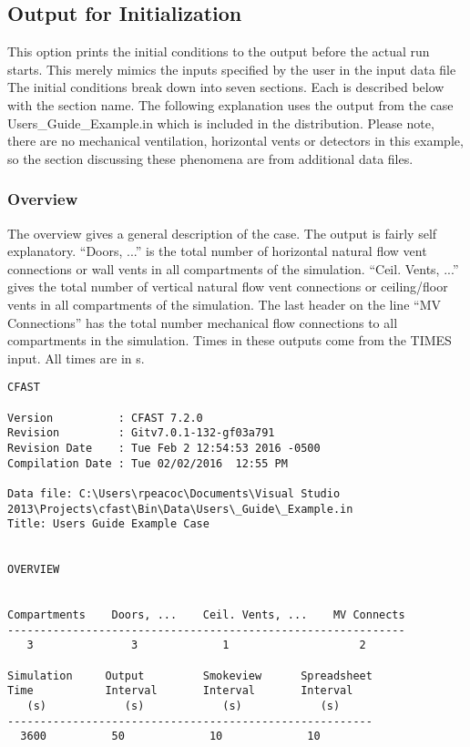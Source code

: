 \subsection{Output for Initialization}

This option prints the initial conditions to the output before the actual run starts.  This merely mimics the inputs specified by the user in the input data file  The initial conditions break down into seven sections.  Each is described below with the section name. The following explanation uses the output from the case Users\_Guide\_Example.in which is included in the distribution. Please note, there are no mechanical ventilation, horizontal vents or detectors in this example, so the section discussing these phenomena are from additional data files.

\subsubsection{Overview}

The overview gives a general description of the case.  The output is fairly self explanatory. ``Doors, ...'' is the total number of horizontal natural flow vent connections or wall vents in all compartments of the simulation.  ``Ceil. Vents, ...'' gives the total number of vertical natural flow vent connections or ceiling/floor vents in all compartments of the simulation.  The last header on the line ``MV Connections'' has the total number mechanical flow connections to all compartments in the simulation. Times in these outputs come from the TIMES input. All times are in s.
\begin{lstlisting}[basicstyle=\tiny]
CFAST

Version          : CFAST 7.2.0
Revision         : Gitv7.0.1-132-gf03a791
Revision Date    : Tue Feb 2 12:54:53 2016 -0500
Compilation Date : Tue 02/02/2016  12:55 PM

Data file: C:\Users\rpeacoc\Documents\Visual Studio 2013\Projects\cfast\Bin\Data\Users\_Guide\_Example.in
Title: Users Guide Example Case


OVERVIEW


Compartments    Doors, ...    Ceil. Vents, ...    MV Connects
-------------------------------------------------------------
   3               3             1                    2

Simulation     Output         Smokeview      Spreadsheet
Time           Interval       Interval       Interval
   (s)            (s)            (s)            (s)
--------------------------------------------------------
  3600          50             10             10
\end{lstlisting}

